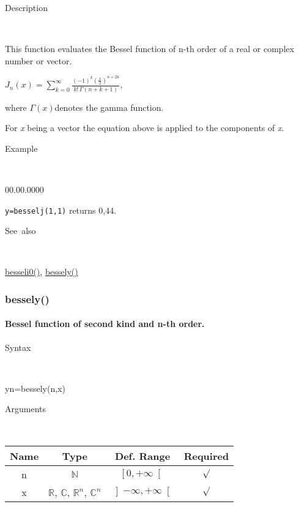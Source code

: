 \begin{description}
\item [Description]~
\end{description}
This function evaluates the Bessel function of n-th order of a real
or complex number or vector.

\medskip{}
$J_{n}\left(x\right)={\displaystyle \sum\limits _{k=0}^{\infty}\frac{\left(-1\right)^{k}\left(\frac{x}{2}\right)^{n+2k}}{k!\,\Gamma\left(n+k+1\right)}}$,
\medskip{}

where $\Gamma\left(x\right)$denotes the gamma function.
\medskip{}

\noindent For \textit{x} being a vector the equation above is applied
to the components of \textit{x}.

\begin{description}
\item [Example]~
\end{description}
\begin{lyxlist}{00.00.0000}
\item [\texttt{y=besselj(1,1)}]returns 0,44.
\end{lyxlist}
\begin{description}
\item [See~also]~
\end{description}
\textcolor{blue}{\hyperlink{besseli0}{besseli0()}}\textcolor{black}{,}
\textcolor{blue}{\hyperlink{bessely}{bessely()}}


\newpage
\subsubsection*{\hypertarget{bessely}{}{\Large bessely()}}


\paragraph{\label{par:Bessel2-function}Bessel function of second kind and n-th
order.}

\begin{description}
\item [Syntax]~
\end{description}
yn=bessely(n,x)

\begin{description}
\item [Arguments]~
\end{description}
\begin{tabular}{|c|c|c|c|}
\hline 
Name&
Type&
Def. Range&
Required\tabularnewline
\hline
\hline 
n&
$\mathbb{N}$&
$\left[0,+\infty\right[$&
$\surd$\tabularnewline
\hline
x&
$\mathbb{R}$, $\mathbb{C}$, $\mathbb{R}^{n}$, $\mathbb{C}^{n}$&
$\left]-\infty,+\infty\right[$&
$\surd$\tabularnewline
\hline
\end{tabular}

